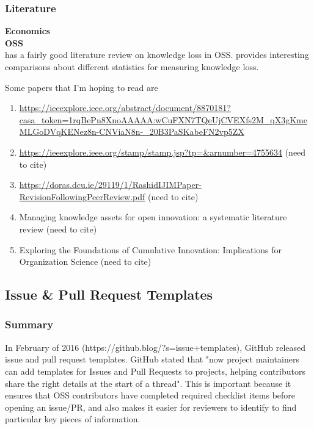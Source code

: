 \documentclass[source/paper/main.tex]{subfiles}
\begin{document}
\subsubsection{Literature}
\textbf{Economics}\\
\textbf{OSS}\\
\cite{rashid_exploring_2017} has a fairly good literature review on knowledge loss in OSS. \cite{nassif_revisiting_2017} provides interesting comparisons about different statistics for measuring knowledge loss. 

Some papers that I'm hoping to read are
\begin{enumerate}
    \item \href{https://ieeexplore.ieee.org/abstract/document/8870181?casa_token=1rqBePn8XnoAAAAA:wCuFXN7TQeUjCVEXfs2M_qX3gKmeMLGoDVqKENez8n-CNViaN8n-_20B3PaSKabeFN2vp5ZX}{https://ieeexplore.ieee.org/abstract/document/8870181?casa\_token=1rqBePn8XnoAAAAA:wCuFXN7TQeUjCVEXfs2M\_qX3gKmeMLGoDVqKENez8n-CNViaN8n-\_20B3PaSKabeFN2vp5ZX}
    \item \href{https://ieeexplore.ieee.org/stamp/stamp.jsp?tp=&arnumber=4755634}{https://ieeexplore.ieee.org/stamp/stamp.jsp?tp=\&arnumber=4755634} (need to cite)
    \item \href{https://doras.dcu.ie/29119/1/RashidIJIMPaper-RevisionFollowingPeerReview.pdf}{https://doras.dcu.ie/29119/1/RashidIJIMPaper-RevisionFollowingPeerReview.pdf} (need to cite)
    \item Managing knowledge assets for open innovation: a systematic literature review (need to cite)
    \item Exploring the Foundations of Cumulative Innovation: Implications for Organization Science (need to cite)
\end{enumerate}
\subsection{Issue \& Pull Request Templates}
\subsubsection{Summary}
In February of 2016 (https://github.blog/?s=issue+templates), GitHub released issue and pull request templates. GitHub stated that "now project maintainers can add templates for Issues and Pull Requests to projects, helping contributors share the right details at the start of a thread". This is important because it ensures that OSS contributors have completed required checklist items before opening an issue/PR, and also makes it easier for reviewers to identify to find particular key pieces of information. 
\end{document}
